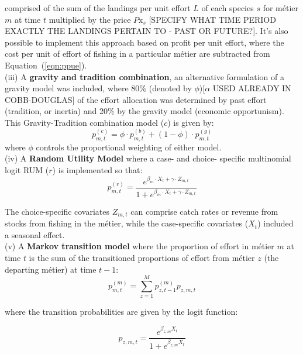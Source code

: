 \documentclass[12pt, halfline, a4paper]{ouparticle}
\begin{document}
comprised of the sum of the landings per unit effort $L$ of each species $s$ for métier $m$ at
time $t$ multiplied by the price $P\text{x}_{s}$ [SPECIFY WHAT TIME PERIOD EXACTLY THE LANDINGS PERTAIN TO - PAST OR FUTURE?]. It's also possible to
implement this approach based on profit per unit effort, where the cost per
unit of effort of fishing in a particular métier are subtracted from Equation~(\ref{eqn:ppue}). \\

(iii) A \textbf{gravity and tradition combination}, an alternative formulation
of a gravity model was included, where 80\% (denoted by $\phi$)[$\alpha$ USED ALREADY IN COBB-DOUGLAS] of the effort
allocation was determined by past effort (tradition, or inertia) and 20\% by
the gravity model (economic opportunism). This Gravity-Tradition combination
model ($c$) is given by:
\begin{equation}
	p^{(c)}_{m,t} = \phi \cdot p^{(b)}_{m,t} + (1 - \phi) \cdot p^{(g)}_{m,t}
\end{equation}
where $\phi$ controls the proportional weighting of either model. \\ 

(iv) A \textbf{Random Utility Model} where a case- and choice- specific
multinomial logit RUM ($r$) is implemented so that:  
\begin{equation}
p^{(r)}_{m,t} = \frac{e^{\beta_{m} \cdot X_{t} + \gamma \cdot Z_{m,t}}}{1 + 
	e^{\beta_{m} \cdot X_{t} + \gamma \cdot Z_{m,t}}}
\label{eqn:rum}
\end{equation} 

The choice-specific covariates $Z_{m,t}$ can comprise catch rates or revenue
from stocks from fishing in the métier, while the case-specific covariates
($X_{t}$) included a seasonal effect. \\

(v) A \textbf{Markov transition model} where the proportion of effort in métier
$m$ at time $t$ is the sum of the transitioned proportions of effort from
métier $z$ (the departing métier) at time $t-1$:
\begin{equation}
p^{(m)}_{m,t} = \sum_{z = 1}^{M} p^{(m)}_{z, t-1} p_{z,m,t}
\end{equation}

where the transition probabilities are given by the logit function:

\begin{equation}
p_{z,m,t} = \frac{e^{\beta_{z,m} X_{t}}}{1+e^{\beta_{z,m} X_{t}}}
\end{equation}
\end{document}
